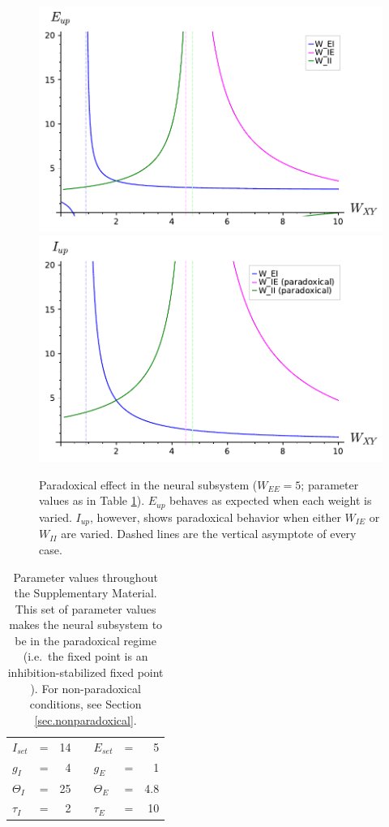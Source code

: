 \documentclass[twocolumn]{article}
\newcommand{\EE}{\mathit{EE}}
\newcommand{\IE}{\mathit{IE}}
\newcommand{\II}{\mathit{II}}
\newcommand{\set}{\mathit{set}}
\newcommand{\up}{\mathit{up}}
\begin{document}
\begin{figure}[!ht]
\centering
\includegraphics[width=\linewidth]{paradoxical_E}
\includegraphics[width=\linewidth]{paradoxical_I}
\caption{Paradoxical effect in the neural subsystem ($W_{\EE}=5$; parameter values as in Table \ref{tab.params}). $E_{\up}$ behaves as expected when each weight is varied. $I_{\up}$, however, shows paradoxical behavior when either $W_{\IE}$ or $W_{\II}$ are varied. Dashed lines are the vertical asymptote of every case.}
\label{fig.paradoxical}
\end{figure}



\begin{table}[ht]
\centering
\begin{tabular}{lcrclcr}
$I_{\set}$ & = & 14 & \hspace{1cm} & $E_{\set}$ & = & 5 \\
$g_I$ & = & 4 & & $g_E$ & = & 1 \\
$\Theta_I$ & = & 25 & & $\Theta_E$ & = & 4.8 \\
$\tau_I$ & = & 2 & & $\tau_E$ & = & 10
\end{tabular}
\caption{Parameter values throughout the Supplementary Material. This set of parameter values makes the neural subsystem to be in the paradoxical regime (i.e.\ the fixed point is an inhibition-stabilized fixed point \cite{Sadeh2021}). For non-paradoxical conditions, see Section \ref{sec.nonparadoxical}.}
\label{tab.params}
\end{table}
\end{document}

